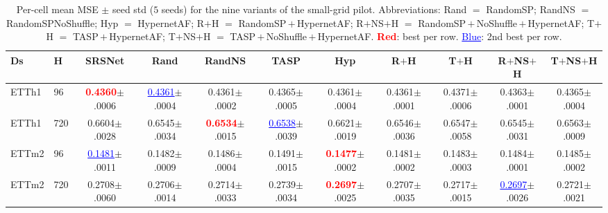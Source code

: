 \begin{table}[h]
  \caption{Per-cell mean MSE $\pm$ seed std ($5$ seeds) for the
    nine variants of the small-grid pilot. Abbreviations:
    Rand $=$ RandomSP; RandNS $=$ RandomSPNoShuffle;
    Hyp $=$ HypernetAF; R$+$H $=$ RandomSP\,$+$\,HypernetAF;
    R$+$NS$+$H $=$ RandomSP\,$+$\,NoShuffle\,$+$\,HypernetAF;
    T$+$H $=$ TASP\,$+$\,HypernetAF;
    T$+$NS$+$H $=$ TASP\,$+$\,NoShuffle\,$+$\,HypernetAF.
    \textcolor{red}{\textbf{Red}}: best per row.
    \textcolor{blue}{\underline{Blue}}: 2nd best per row.}
  \label{tab:smallgrid-cells}
  \begin{center}
  \tiny
  \setlength{\tabcolsep}{1.5pt}
  \begin{tabular}{ll|ccccccccc}
    \toprule
    Ds & H & SRSNet & Rand & RandNS & TASP & Hyp & R$+$H & T$+$H & R$+$NS$+$H & T$+$NS$+$H \\
    \midrule
    ETTh1 & 96  & \textcolor{red}{\textbf{0.4360}}{\scriptsize $\pm$.0006} & \textcolor{blue}{\underline{0.4361}}{\scriptsize $\pm$.0004} & 0.4361{\scriptsize $\pm$.0002} & 0.4365{\scriptsize $\pm$.0005} & 0.4361{\scriptsize $\pm$.0004} & 0.4361{\scriptsize $\pm$.0001} & 0.4371{\scriptsize $\pm$.0006} & 0.4363{\scriptsize $\pm$.0001} & 0.4365{\scriptsize $\pm$.0004} \\
    ETTh1 & 720 & 0.6604{\scriptsize $\pm$.0028} & 0.6545{\scriptsize $\pm$.0034} & \textcolor{red}{\textbf{0.6534}}{\scriptsize $\pm$.0015} & \textcolor{blue}{\underline{0.6538}}{\scriptsize $\pm$.0039} & 0.6621{\scriptsize $\pm$.0019} & 0.6546{\scriptsize $\pm$.0036} & 0.6547{\scriptsize $\pm$.0058} & 0.6545{\scriptsize $\pm$.0031} & 0.6563{\scriptsize $\pm$.0009} \\
    ETTm2 & 96  & \textcolor{blue}{\underline{0.1481}}{\scriptsize $\pm$.0011} & 0.1482{\scriptsize $\pm$.0009} & 0.1486{\scriptsize $\pm$.0004} & 0.1491{\scriptsize $\pm$.0015} & \textcolor{red}{\textbf{0.1477}}{\scriptsize $\pm$.0002} & 0.1481{\scriptsize $\pm$.0002} & 0.1483{\scriptsize $\pm$.0003} & 0.1484{\scriptsize $\pm$.0001} & 0.1485{\scriptsize $\pm$.0002} \\
    ETTm2 & 720 & 0.2708{\scriptsize $\pm$.0060} & 0.2706{\scriptsize $\pm$.0014} & 0.2714{\scriptsize $\pm$.0033} & 0.2739{\scriptsize $\pm$.0034} & \textcolor{red}{\textbf{0.2697}}{\scriptsize $\pm$.0025} & 0.2707{\scriptsize $\pm$.0035} & 0.2717{\scriptsize $\pm$.0015} & \textcolor{blue}{\underline{0.2697}}{\scriptsize $\pm$.0026} & 0.2721{\scriptsize $\pm$.0021} \\
    \bottomrule
  \end{tabular}
  \end{center}
\end{table}


